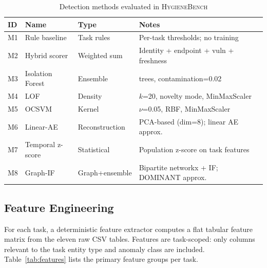 \documentclass[conference]{IEEEtran}
\newcommand{\hb}{\textsc{HygieneBench}\xspace}
\begin{document}
\begin{table}[t]
\centering
\caption{Detection methods evaluated in \hb}
\label{tab:methods}
\scriptsize
\begin{tabular}{@{}lll>{\raggedright\arraybackslash}p{3.0cm}@{}}
\toprule
ID & Name & Type & Notes \\
\midrule
M1 & Rule baseline  & Task rules       & Per-task thresholds; no training \\
M2 & Hybrid scorer  & Weighted sum     & Identity + endpoint + vuln + freshness \\
M3 & Isolation Forest & Ensemble       & 200 trees, contamination=0.02 \\
M4 & LOF            & Density          & $k$=20, novelty mode, MinMaxScaler \\
M5 & OCSVM          & Kernel           & $\nu$=0.05, RBF, MinMaxScaler \\
M6 & Linear-AE      & Reconstruction   & PCA-based (dim=8); linear AE approx. \\
M7 & Temporal z-score & Statistical    & Population z-score on task features \\
M8 & Graph-IF       & Graph+ensemble   & Bipartite networkx + IF; DOMINANT approx. \cite{ding2019dominant} \\
\bottomrule
\end{tabular}
\end{table}

\subsection{Feature Engineering}

For each task, a deterministic feature extractor computes a flat tabular feature
matrix from the eleven raw CSV tables. Features are task-scoped: only columns
relevant to the task entity type and anomaly class are included.
Table~\ref{tab:features} lists the primary feature groups per task.
\end{document}
